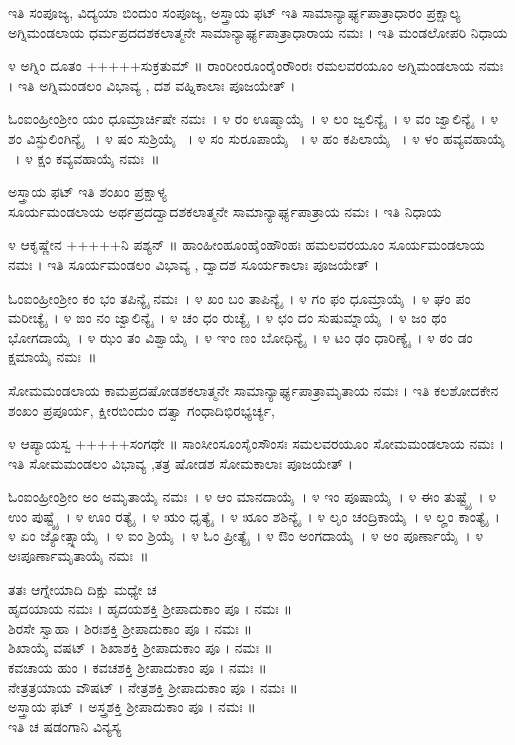 ಇತಿ ಸಂಪೂಜ್ಯ, ವಿದ್ಯಯಾ ಬಿಂದುಂ ಸಂಪೂಜ್ಯ, ಅಸ್ತ್ರಾಯ ಫಟ್ ಇತಿ ಸಾಮಾನ್ಯಾರ್ಘ್ಯಪಾತ್ರಾಧಾರಂ ಪ್ರಕ್ಷಾಲ್ಯ\\
 ಅಗ್ನಿಮಂಡಲಾಯ ಧರ್ಮಪ್ರದದಶಕಲಾತ್ಮನೇ ಸಾಮಾನ್ಯಾರ್ಘ್ಯಪಾತ್ರಾಧಾರಾಯ ನಮಃ । ಇತಿ ಮಂಡಲೋಪರಿ ನಿಧಾಯ

೪ ಅಗ್ನಿಂ ದೂತಂ +++++ಸುಕ್ರತುಮ್ ॥ ರಾಂರೀಂರೂಂರೈಂರೌಂರಃ ರಮಲವರಯೂಂ ಅಗ್ನಿಮಂಡಲಾಯ ನಮಃ । ಇತಿ ಅಗ್ನಿಮಂಡಲಂ ವಿಭಾವ್ಯ , ದಶ ವಹ್ನಿಕಾಲಾಃ ಪೂಜಯೇತ್ ।

ಓಂಐಂಹ್ರೀಂಶ್ರೀಂ ಯಂ ಧೂಮ್ರಾರ್ಚಿಷೇ   ನಮಃ~। ೪  ರಂ ಊಷ್ಮಾಯೈ~। ೪  ಲಂ ಜ್ವಲಿನ್ಯೈ~। ೪  ವಂ ಜ್ವಾಲಿನ್ಯೈ~। ೪  ಶಂ ವಿಸ್ಫುಲಿಂಗಿನ್ಯೈ ~। ೪  ಷಂ ಸುಶ್ರಿಯೈ ~। ೪  ಸಂ ಸುರೂಪಾಯೈ ~। ೪  ಹಂ ಕಪಿಲಾಯೈ ~। ೪  ಳಂ ಹವ್ಯವಹಾಯೈ ~। ೪  ಕ್ಷಂ ಕವ್ಯವಹಾಯೈ ನಮಃ~॥

ಅಸ್ತ್ರಾಯ ಫಟ್ ಇತಿ ಶಂಖಂ ಪ್ರಕ್ಷಾಳ್ಯ\\
 ಸೂರ್ಯಮಂಡಲಾಯ ಅರ್ಥಪ್ರದದ್ವಾದಶಕಲಾತ್ಮನೇ ಸಾಮಾನ್ಯಾರ್ಘ್ಯಪಾತ್ರಾಯ ನಮಃ । ಇತಿ ನಿಧಾಯ

೪ ಆಕೃಷ್ಣೇನ +++++ನಿ ಪಶ್ಯನ್ ॥ ಹಾಂಹೀಂಹೂಂಹೈಂಹೌಂಹಃ ಹಮಲವರಯೂಂ ಸೂರ್ಯಮಂಡಲಾಯ ನಮಃ । ಇತಿ ಸೂರ್ಯಮಂಡಲಂ ವಿಭಾವ್ಯ , ದ್ವಾದಶ ಸೂರ್ಯಕಾಲಾಃ ಪೂಜಯೇತ್ ।

ಓಂಐಂಹ್ರೀಂಶ್ರೀಂ ಕಂ ಭಂ ತಪಿನ್ಯೈ ನಮಃ~। ೪ ಖಂ ಬಂ ತಾಪಿನ್ಯೈ~। ೪ ಗಂ ಫಂ ಧೂಮ್ರಾಯೈ~। ೪ ಘಂ ಪಂ ಮರೀಚ್ಯೈ~। ೪ ಙಂ ನಂ ಜ್ವಾಲಿನ್ಯೈ~। ೪ ಚಂ ಧಂ ರುಚ್ಯೈ~। ೪ ಛಂ ದಂ ಸುಷುಮ್ನಾಯೈ~। ೪ ಜಂ ಥಂ ಭೋಗದಾಯೈ~। ೪ ಝಂ ತಂ ವಿಶ್ವಾಯೈ~। ೪ ಞಂ ಣಂ ಬೋಧಿನ್ಯೈ~। ೪ ಟಂ ಢಂ ಧಾರಿಣ್ಯೈ~। ೪ ಠಂ ಡಂ ಕ್ಷಮಾಯೈ ನಮಃ~॥

 ಸೋಮಮಂಡಲಾಯ ಕಾಮಪ್ರದಷೋಡಶಕಲಾತ್ಮನೇ ಸಾಮಾನ್ಯಾರ್ಘ್ಯಪಾತ್ರಾಮೃತಾಯ ನಮಃ । ಇತಿ ಕಲಶೋದಕೇನ ಶಂಖಂ ಪ್ರಪೂರ್ಯ, ಕ್ಷೀರಬಿಂದುಂ ದತ್ವಾ  ಗಂಧಾದಿಭಿರಭ್ಯರ್ಚ್ಯ,

೪ ಆಪ್ಯಾಯಸ್ವ +++++ಸಂಗಥೇ ॥ ಸಾಂಸೀಂಸೂಂಸೈಂಸೌಂಸಃ ಸಮಲವರಯೂಂ ಸೋಮಮಂಡಲಾಯ ನಮಃ । ಇತಿ ಸೋಮಮಂಡಲಂ ವಿಭಾವ್ಯ ,ತತ್ರ ಷೋಡಶ ಸೋಮಕಾಲಾಃ ಪೂಜಯೇತ್ ।

ಓಂಐಂಹ್ರೀಂಶ್ರೀಂ ಅಂ ಅಮೃತಾಯೈ ನಮಃ~। ೪ ಆಂ ಮಾನದಾಯೈ~। ೪ ಇಂ ಪೂಷಾಯೈ~। ೪ ಈಂ ತುಷ್ಟ್ಯೈ~। ೪ ಉಂ ಪುಷ್ಟ್ಯೈ~। ೪ ಊಂ ರತ್ಯೈ~। ೪ ಋಂ ಧೃತ್ಯೈ~। ೪ ೠಂ ಶಶಿನ್ಯೈ~। ೪ ಲೃಂ ಚಂದ್ರಿಕಾಯೈ~। ೪ ಲೄಂ ಕಾಂತ್ಯೈ~। ೪ ಏಂ ಜ್ಯೋತ್ಸ್ನಾಯೈ~। ೪ ಐಂ ಶ್ರಿಯೈ~। ೪ ಓಂ ಪ್ರೀತ್ಯೈ~। ೪ ಔಂ ಅಂಗದಾಯೈ~। ೪ ಅಂ ಪೂರ್ಣಾಯೈ~। ೪ ಅಃಪೂರ್ಣಾಮೃತಾಯೈ ನಮಃ~॥

ತತಃ ಆಗ್ನೇಯಾದಿ ದಿಕ್ಷು ಮಧ್ಯೇ ಚ \\
 ಹೃದಯಾಯ ನಮಃ । ಹೃದಯಶಕ್ತಿ ಶ್ರೀಪಾದುಕಾಂ ಪೂ । ನಮಃ ॥\\
 ಶಿರಸೇ ಸ್ವಾಹಾ । ಶಿರಃಶಕ್ತಿ ಶ್ರೀಪಾದುಕಾಂ ಪೂ । ನಮಃ ॥\\
 ಶಿಖಾಯೈ ವಷಟ್ । ಶಿಖಾಶಕ್ತಿ ಶ್ರೀಪಾದುಕಾಂ ಪೂ । ನಮಃ ॥\\
 ಕವಚಾಯ ಹುಂ । ಕವಚಶಕ್ತಿ ಶ್ರೀಪಾದುಕಾಂ ಪೂ । ನಮಃ ॥\\
 ನೇತ್ರತ್ರಯಾಯ ವೌಷಟ್ । ನೇತ್ರಶಕ್ತಿ ಶ್ರೀಪಾದುಕಾಂ ಪೂ । ನಮಃ ॥\\
 ಅಸ್ತ್ರಾಯ ಫಟ್ । ಅಸ್ತ್ರಶಕ್ತಿ ಶ್ರೀಪಾದುಕಾಂ ಪೂ । ನಮಃ ॥\\
ಇತಿ ಚ ಷಡಂಗಾನಿ ವಿನ್ಯಸ್ಯ\\

